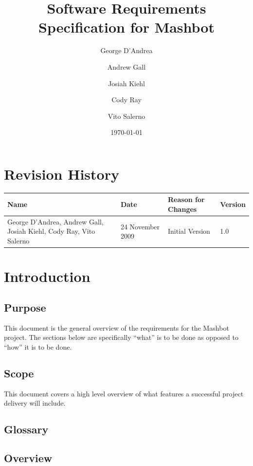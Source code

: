\documentclass{report}
\begin{document}
\title{Software Requirements Specification for Mashbot} 
\author{George D'Andrea \and Andrew Gall \and Josiah Kiehl \and
  Cody Ray \and Vito Salerno}
\date{\today}
\begin{titlepage}
\maketitle
\end{titlepage}

\section*{Revision History}
\begin{tabular}{|p{2in}|l|l|l|}
          \hline
          \textbf{Name} & \textbf{Date} & \textbf{Reason for Changes} & \textbf{Version} \\
          \hline \hline
          George D'Andrea, Andrew Gall, Josiah Kiehl, Cody Ray, Vito
          Salerno & 24 November 2009 & Initial Version & 1.0 \\
          \hline
        \end{tabular}


\tableofcontents

\section{Introduction}

\subsection{Purpose} %
This document is the general overview of the requirements for the Mashbot 
project.  The sections below are specifically ``what'' is to be done as opposed 
to ``how'' it is to be done.
\subsection{Scope} %
This document covers a high level overview of what features a successful project 
delivery will include.
\subsection{Glossary} %
\subsection{Overview} %
\end{document}

